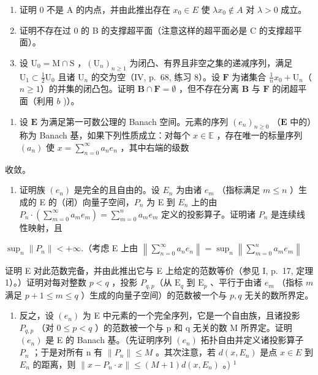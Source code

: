 \begin{enumerate}
\def\labelenumi{\alph{enumi})}
\item
  证明 0 不是 A 的内点，并由此推出存在 \(x_0 \in E\) 使 \(\lambda x_0 \notin A\) 对 \(\lambda > 0\) 成立。
\item
  证明不存在过 0 的 B 的支撑超平面（注意这样的超平面必是 C 的支撑超平面）。
\item
  设 \(\mathrm{U}_0 = \mathrm{M} \cap \mathrm{S}\) ，\((\mathrm{U}_n)_{n \geqslant 1}\) 为闭凸、有界且非空之集的递减序列，满足 \(\mathrm{U}_1 \subset \frac{1}{2}\mathrm{U}_0\) 且诸 \(\mathrm{U}_n\) 的交为空（IV, p.~68, 练习 8）。设 \(\mathbf{F}\) 为诸集合 \(\frac{1}{n} x_0 + \mathrm{U}_n\)（\(n \geqslant 1\)）的并集的闭凸包。证明 \(\mathbf{B} \cap \mathbf{F} = \emptyset\) ，但不存在分离 \(\mathbf{B}\) 与 \(\mathbf{F}\) 的闭超平面（利用 \(b\) )）。
\end{enumerate}

\begin{enumerate}
\def\labelenumi{\arabic{enumi})}
\setcounter{enumi}{13}
\tightlist
\item
  设 \(\mathbf{E}\) 为满足第一可数公理的 Banach 空间。元素的序列 \((e_n)_{n\geqslant 0}\) （\(\mathbf{E}\) 中的）称为 Banach 基，如果下列性质成立：对每个 \(x\in \mathbb{E}\) ，存在唯一的标量序列 \((a_{n})\) 使 \(x = \sum_{n = 0}^{\infty}a_{n}e_{n}\) ，其中右端的级数
\end{enumerate}

收敛。

\begin{enumerate}
\def\labelenumi{\alph{enumi})}
\tightlist
\item
  证明族 \((e_n)\) 是完全的且自由的。设 \(E_n\) 为由诸 \(e_m\) （指标满足 \(m \leqslant n\) ）生成的 E 的（闭）向量子空间，\(P_n\) 为 E 到 \(E_n\) 上的由 \(P_n \cdot (\sum_{m=0}^{\infty} a_m e_m) = \sum_{m=0}^{n} a_m e_m\) 定义的投影算子。证明诸 \(P_n\) 是连续线性映射，且
\end{enumerate}

\(\sup_{n}\| P_{n}\| < + \infty .\)（考虑 E 上由 \(\left\| \sum_{n = 0}^{\infty}a_n e_n\right\| = \sup_{n}\left\| \sum_{m = 0}^{n}a_me_m\right\|\)

证明 E 对此范数完备，并由此推出它与 E 上给定的范数等价（参见 I, p.~17, 定理 1）。）证明对每对整数 \(p < q\) ，投影 \(P_{q,p}\)（从 \(\mathrm{E}_q\) 到 \(\mathrm{E}_p\) 、平行于由诸 \(e_m\) （指标 \(m\) 满足 \(p + 1 \leqslant m \leqslant q\) ）生成的向量子空间）的范数被一个与 \(p, q\) 无关的数所界定。

\begin{enumerate}
\def\labelenumi{\alph{enumi})}
\setcounter{enumi}{1}
\tightlist
\item
  反之，设 \((e_{n})\) 为 E 中元素的一个完全序列，它是一个自由族，且诸投影 \(P_{q,p}\) （对 \(0 \leqslant p < q\) ）的范数被一个与 p 和 q 无关的数 M 所界定。证明 \((e_{n})\) 是 E 的 Banach 基。（先证明序列 \((e_{n})\) 拓扑自由并定义诸投影算子 \(P_{n}\) ；于是对所有 n 有 \(\|P_{n}\| \leqslant M\) 。其次注意，若 \(d(x, E_{n})\) 是点 \(x \in E\) 到 \(E_{n}\) 的距离，则 \(\|x - P_{n} \cdot x\| \leqslant (M + 1) d(x, E_{n})\) 。) \(^{1}\)
\end{enumerate}


